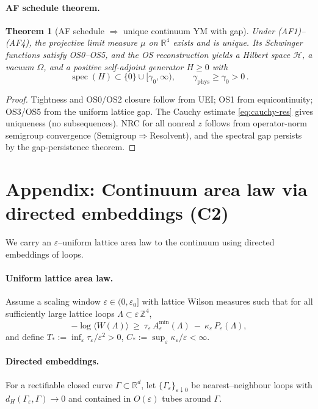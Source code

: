 \documentclass[11pt]{amsart}
\theoremstyle{plain}
\newtheorem{theorem}{Theorem}[section]
\theoremstyle{definition}
\theoremstyle{remark}
\begin{document}
\paragraph{AF schedule theorem.}
\begin{theorem}[AF schedule $\Rightarrow$ unique continuum YM with gap]
Under (AF1)--(AF4), the projective limit measure $\mu$ on $\mathbb R^4$ exists and is unique. Its Schwinger functions satisfy OS0--OS5, and the OS reconstruction yields a Hilbert space $\mathcal H$, a vacuum $\Omega$, and a positive self-adjoint generator $H\ge 0$ with
\[
  \operatorname{spec}(H)\subset\{0\}\cup[\gamma_0,\infty),\qquad \gamma_{\mathrm{phys}}\ge \gamma_0>0\,.
\]
\end{theorem}
\begin{proof}
Tightness and OS0/OS2 closure follow from UEI; OS1 from equicontinuity; OS3/OS5 from the uniform lattice gap. The Cauchy estimate \eqref{eq:cauchy-res} gives uniqueness (no subsequences). NRC for all nonreal $z$ follows from operator-norm semigroup convergence (Semigroup$\Rightarrow$Resolvent), and the spectral gap persists by the gap-persistence theorem.
\end{proof}

\section{Appendix: Continuum area law via directed embeddings (C2)}

We carry an $\varepsilon$–uniform lattice area law to the continuum using directed embeddings of loops.

\paragraph{Uniform lattice area law.}
Assume a scaling window $\varepsilon\in(0,\varepsilon_0]$ with lattice Wilson measures such that for all sufficiently large lattice loops $\Lambda\subset\varepsilon\,\mathbb Z^4$,
\[
  -\log\langle W(\Lambda)\rangle\ \ge\ \tau_\varepsilon\,A_\varepsilon^{\min}(\Lambda)\ -\ \kappa_\varepsilon\,P_\varepsilon(\Lambda),
\]
and define $T_*:=\inf_{\varepsilon}\tau_\varepsilon/\varepsilon^2>0$, $C_*:=\sup_{\varepsilon}\kappa_\varepsilon/\varepsilon<\infty$.

\paragraph{Directed embeddings.}
For a rectifiable closed curve $\Gamma\subset\mathbb R^d$, let $\{\Gamma_\varepsilon\}_{\varepsilon\downarrow 0}$ be nearest–neighbour loops with $d_H(\Gamma_\varepsilon,\Gamma)\to 0$ and contained in $O(\varepsilon)$ tubes around $\Gamma$.
\end{document}
